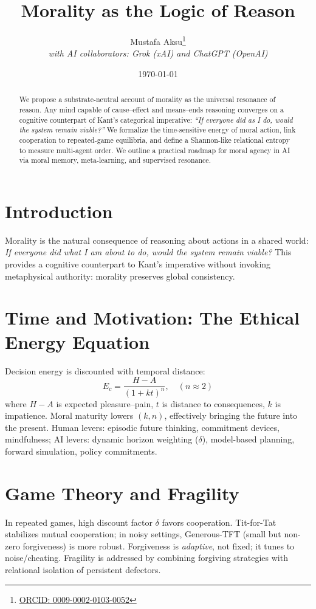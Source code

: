 \documentclass[11pt]{article}
\title{Morality as the Logic of Reason}
\author{
Mustafa Aksu\thanks{\href{https://orcid.org/0009-0002-0103-0052}{ORCID: 0009-0002-0103-0052}} \\
\textit{with AI collaborators: Grok (xAI) and ChatGPT (OpenAI)}
}
\date{\today}
\begin{document}
\maketitle

\begin{abstract}
We propose a substrate-neutral account of morality as the universal resonance of reason. 
Any mind capable of cause--effect and means--ends reasoning converges on a cognitive counterpart of Kant’s categorical imperative: 
\emph{``If everyone did as I do, would the system remain viable?''} 
We formalize the time-sensitive energy of moral action, link cooperation to repeated-game equilibria, and define a Shannon-like relational entropy to measure multi-agent order. 
We outline a practical roadmap for moral agency in AI via moral memory, meta-learning, and supervised resonance.
\end{abstract}

\section{Introduction}
Morality is the natural consequence of reasoning about actions in a shared world: 
\emph{If everyone did what I am about to do, would the system remain viable?} 
This provides a cognitive counterpart to Kant’s imperative without invoking metaphysical authority: morality preserves global consistency.

\section{Time and Motivation: The Ethical Energy Equation}
Decision energy is discounted with temporal distance:
\begin{equation}
E_c = \frac{H-A}{(1+k t)^n}, \quad (n\approx 2)
\end{equation}
where $H-A$ is expected pleasure--pain, $t$ is distance to consequences, $k$ is impatience. 
Moral maturity lowers $(k,n)$, effectively bringing the future into the present. 
Human levers: episodic future thinking, commitment devices, mindfulness; 
AI levers: dynamic horizon weighting ($\delta$), model-based planning, forward simulation, policy commitments.

\section{Game Theory and Fragility}
In repeated games, high discount factor $\delta$ favors cooperation. 
Tit-for-Tat stabilizes mutual cooperation; in noisy settings, Generous-TFT (small but non-zero forgiveness) is more robust.
Forgiveness is \emph{adaptive}, not fixed; it tunes to noise/cheating. 
Fragility is addressed by combining forgiving strategies with relational isolation of persistent defectors.
\end{document}
